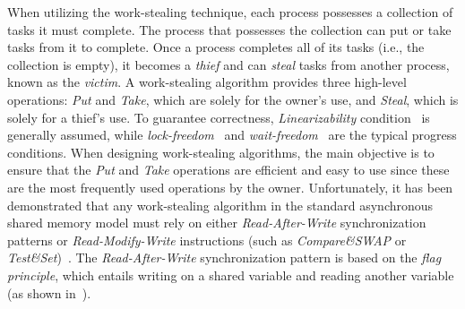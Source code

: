 When utilizing the work-stealing technique, each process possesses a collection of tasks it must complete. The process that possesses the collection can put or take tasks from it to complete. Once a process completes all of its tasks (i.e., the collection is empty), it becomes a \emph{thief} and can \emph{steal} tasks from another process, known as the \emph{victim}. A work-stealing algorithm provides three high-level operations: \emph{Put} and \emph{Take}, which are solely for the owner's use, and \emph{Steal}, which is solely for a thief's use. To guarantee correctness, \emph{Linearizability} condition~\cite{DBLP_journals_toplas_HerlihyW90}  is generally assumed, while \emph{lock-freedom}~\cite{DBLP_journals_toplas_HerlihyW90}  and \emph{wait-freedom}~\cite{DBLP_journals_toplas_Herlihy91} are the typical progress conditions. When designing work-stealing algorithms, the main objective is to ensure that the \emph{Put} and \emph{Take} operations are efficient and easy to use since these are the most frequently used operations by the owner. Unfortunately, it has been demonstrated that any work-stealing algorithm in the standard asynchronous shared memory model must rely on either \emph{Read-After-Write} synchronization patterns or \emph{Read-Modify-Write} instructions (such as \textit{Compare\&SWAP} or \textit{Test\&Set})~\cite{DBLP_conf_popl_AttiyaGHKMV11}. The \emph{Read-After-Write} synchronization pattern is based on the \emph{flag principle}, which entails writing on a shared variable and reading another variable (as shown in~\cite{DBLP_books_daglib_0020056}).

